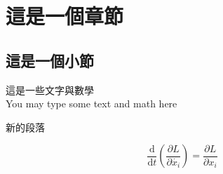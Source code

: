 \section{這是一個章節}
\subsection{這是一個小節}
這是一些文字與數學
\\ %
You may type some text and math here
\par %
新的段落

\[\frac{\mathrm{d}}{\mathrm{d}t}(\frac{\partial L}{\partial \dot{x_i}})=\frac{\partial L}{\partial x_i}\]